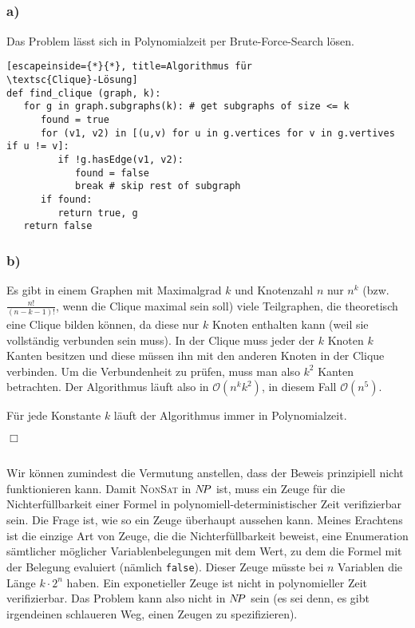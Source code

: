\documentclass{article}
\begin{document}
\subsection{} 

\subsubsection{a)}


Das Problem lässt sich in Polynomialzeit per Brute-Force-Search lösen.
\begin{lstlisting}[escapeinside={*}{*}, title=Algorithmus für
\textsc{Clique}-Lösung]
def find_clique (graph, k):
   for g in graph.subgraphs(k): # get subgraphs of size <= k
      found = true
      for (v1, v2) in [(u,v) for u in g.vertices for v in g.vertives if u != v]:
         if !g.hasEdge(v1, v2):
            found = false
            break # skip rest of subgraph
      if found:
         return true, g
   return false
\end{lstlisting}

\subsubsection{b)}

Es gibt in einem Graphen mit Maximalgrad $k$ und Knotenzahl $n$ nur
$n^k$ (bzw. $\frac{n!}{(n-k-1)!}$, wenn die Clique maximal sein soll)  viele
Teilgraphen, die theoretisch eine Clique bilden können, da diese nur $k$ Knoten
enthalten kann (weil sie vollständig verbunden sein muss). In der Clique muss
jeder der $k$ Knoten $k$ Kanten besitzen und diese müssen ihn mit den anderen
Knoten in der Clique verbinden. Um die Verbundenheit zu prüfen, muss man also
$k^2$ Kanten betrachten. Der Algorithmus läuft also in
$\mathcal{O}\left(n^k k^2\right)$, in diesem Fall $\mathcal{O}\left(n^5\right)$.

Für jede Konstante $k$ läuft der Algorithmus immer in Polynomialzeit.

\hfill{}$\Box$
\subsection{} 

Wir können zumindest die Vermutung anstellen, dass der Beweis prinzipiell nicht
funktionieren kann. Damit \textsc{NonSat} in $N\kern-2ptP$ ist, muss ein Zeuge für die
Nichterfüllbarkeit einer Formel in polynomiell-deterministischer Zeit
verifizierbar sein. Die Frage ist, wie so ein Zeuge überhaupt aussehen kann.
Meines Erachtens ist die einzige Art von Zeuge, die die Nichterfüllbarkeit
beweist, eine Enumeration sämtlicher möglicher Variablenbelegungen mit dem Wert,
zu dem die Formel mit der Belegung evaluiert (nämlich \texttt{false}). Dieser Zeuge müsste bei $n$
Variablen die Länge $k\cdot2^n$ haben. Ein exponetieller Zeuge ist nicht in
polynomieller Zeit verifizierbar. Das Problem kann also nicht in $N\kern-2ptP$ sein (es
sei denn, es gibt irgendeinen schlaueren Weg, einen Zeugen zu spezifizieren).
\end{document}
